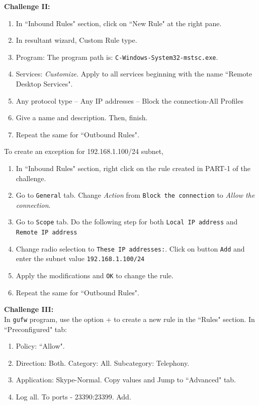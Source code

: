 \documentclass[12pt]{extarticle}
\begin{document}
\vspace{4mm}
\item \textbf{Challenge II:}
\begin{enumerate}
\item In ``Inbound Rules" section, click on ``New Rule" at the right pane. 
\item In resultant wizard, Custom Rule type. 
\item Program: The program path is: \texttt{C-Windows-System32-mstsc.exe}.
\item Services: \textit{Customize}. Apply to all services beginning with the name ``Remote Desktop Services".
\item Any protocol type -- Any IP addresses -- Block the connection-All Profiles
\item Give a name and description. Then, finish.
\item Repeat the same for ``Outbound Rules".
\end{enumerate}

\noindent
To create an exception for 192.168.1.100/24 subnet, 

\begin{enumerate}
\item In ``Inbound Rules" section, right click on the rule created in PART-1 of the challenge.  
\item Go to \texttt{General} tab. Change \textit{Action} from \texttt{Block the connection} to \textit{Allow the connection}.
\item Go to \texttt{Scope} tab. Do the following step for both \texttt{Local IP address} and \texttt{Remote IP address}
\item Change radio selection to \texttt{These IP addresses:}. Click on button \texttt{Add} and enter the subnet value \texttt{192.168.1.100/24}
\item Apply the modifications and \texttt{OK} to change the rule.
\item Repeat the same for ``Outbound Rules".
\end{enumerate}

\vspace{4mm}
\item \textbf{Challenge III:}\\

\noindent 
In \texttt{gufw} program, use the option + to create a new rule in the ``Rules" section. In ``Preconfigured" tab:

\begin{enumerate}
\item Policy: ``Allow".  
\item Direction: Both. Category: All. Subcategory: Telephony.
\item Application: Skype-Normal. Copy values and Jump to ``Advanced" tab.
\item Log all. To ports - 23390:23399. Add. 
\end{enumerate}
\end{document}
